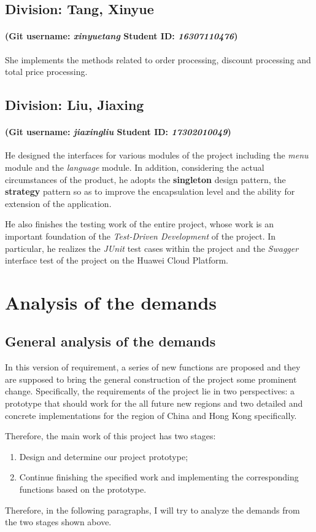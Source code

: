 \documentclass[a4paper]{report}
\begin{document}
\section{Division: Tang, Xinyue}
\subsubsection{(Git username: \emph{xinyuetang} Student ID: \emph{16307110476})}
She implements the methods related to order processing, discount processing and total price processing.

\section{Division: Liu, Jiaxing}
\subsubsection{(Git username: \emph{jiaxingliu} Student ID: \emph{17302010049})}
He designed the interfaces for various modules of the project including the \emph{menu} module and the \emph{language} module. In addition, considering the actual circumstances of the product, he adopts the \textbf{singleton} design pattern, the \textbf{strategy} pattern so as to improve the encapsulation level and the ability for extension of the application. 
\par
He also finishes the testing work of the entire project, whose work  is an important foundation of the \emph{Test-Driven Development} of the project. In particular, he realizes the \emph{JUnit} test cases within the project and the \emph{Swagger} interface test of the project on the Huawei Cloud Platform.

\chapter{Analysis of the demands}
\section{General analysis of the demands}
In this version of requirement, a series of new functions are proposed and they are supposed to bring the general construction of the project some prominent change. Specifically, the requirements of the project lie in two perspectives: a prototype that should work for the all future new regions and two detailed and concrete implementations for the region of China and Hong Kong specifically.
\par
Therefore, the main work of this project has two stages:
\begin{enumerate}
\item
Design and determine our project prototype;
\item
Continue finishing the specified work and implementing the corresponding functions based on the prototype.
\end{enumerate}
\par
Therefore, in the following paragraphs, I will try to analyze the demands from the two stages shown above.
\end{document}

